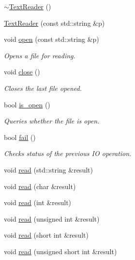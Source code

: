 \begin{DoxyCompactItemize}
\mbox{\hyperlink{classENSEM_1_1TextReader_a95ed1b116302f6fc2532451bd5df2dbd}{$\sim$\+Text\+Reader}} ()
\item 
\mbox{\hyperlink{classENSEM_1_1TextReader_a1c253bcaf58b6f01f25bb10b798f771e}{Text\+Reader}} (const std\+::string \&p)
\item 
void \mbox{\hyperlink{classENSEM_1_1TextReader_a167e412dc7a3a56fae35ccb4cc9d9029}{open}} (const std\+::string \&p)
\begin{DoxyCompactList}\small\item\em Opens a file for reading. \end{DoxyCompactList}\item 
void \mbox{\hyperlink{classENSEM_1_1TextReader_a19f171518a1c7a06739d2d7de016f346}{close}} ()
\begin{DoxyCompactList}\small\item\em Closes the last file opened. \end{DoxyCompactList}\item 
bool \mbox{\hyperlink{classENSEM_1_1TextReader_a67e8ac68ff413c1101522eedafc2d994}{is\+\_\+open}} ()
\begin{DoxyCompactList}\small\item\em Queries whether the file is open. \end{DoxyCompactList}\item 
bool \mbox{\hyperlink{classENSEM_1_1TextReader_ae21c25d2a62a1b242b09d745a314af69}{fail}} ()
\begin{DoxyCompactList}\small\item\em Checks status of the previous IO operation. \end{DoxyCompactList}\item 
void \mbox{\hyperlink{classENSEM_1_1TextReader_acbeb934e3316e4cf0c74d23dbe473d19}{read}} (std\+::string \&result)
\item 
void \mbox{\hyperlink{classENSEM_1_1TextReader_acfa438667353be1fd79c0170344eefe8}{read}} (char \&result)
\item 
void \mbox{\hyperlink{classENSEM_1_1TextReader_a674bcd7e14e71926e02d70939876ef56}{read}} (int \&result)
\item 
void \mbox{\hyperlink{classENSEM_1_1TextReader_aa35f21aaaa60529fe88ca35b13727d68}{read}} (unsigned int \&result)
\item 
void \mbox{\hyperlink{classENSEM_1_1TextReader_a74b47b82fb54027158d1623307f6e8c1}{read}} (short int \&result)
\item 
void \mbox{\hyperlink{classENSEM_1_1TextReader_a94c542aaec54ff618064c61e8602eefa}{read}} (unsigned short int \&result)

\end{DoxyCompactItemize}
